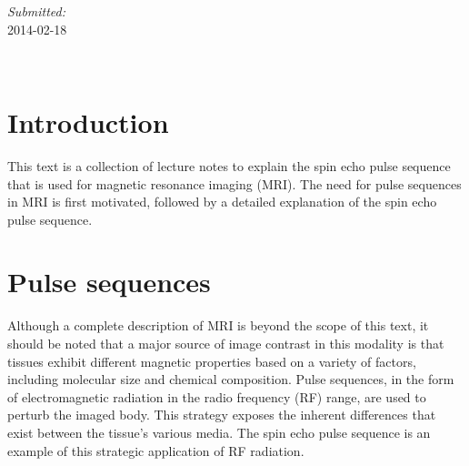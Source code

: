\documentclass[12pt]{article} %
\begin{document}
\begin{titlepage}

\begin{minipage}{0.4\textwidth}
\begin{center} \large
\emph{Submitted:} \\
2014-02-18 %
\end{center}
\end{minipage}\\[4cm]

\vfill %
\end{titlepage}


\fontsize{12}{19.416407865}%
\selectfont

\section{Introduction}
This text is a collection of lecture notes to explain the spin echo pulse sequence that is used for magnetic resonance imaging (MRI). 
The need for pulse sequences in MRI is first motivated, followed by a detailed explanation of the spin echo pulse sequence.

\section{Pulse sequences}
Although a complete description of MRI is beyond the scope of this text, it should be noted that a major source of image contrast in this modality is that tissues exhibit different magnetic properties based on a variety of factors, including molecular size and chemical composition. 
Pulse sequences, in the form of electromagnetic radiation in the radio frequency (RF) range, are used to perturb the imaged body. This strategy exposes the inherent differences that exist between the tissue's various media. 
The spin echo pulse sequence is an example of this strategic application of RF radiation.
\end{document}
